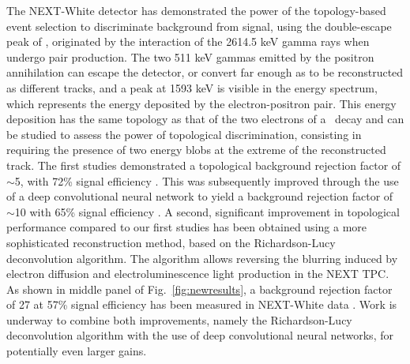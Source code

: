 The NEXT-White detector has demonstrated the power of the topology-based event selection to discriminate background from signal, using the double-escape peak of , originated by the interaction of the 2614.5 keV gamma rays when undergo pair production. The two 511 keV gammas emitted by the positron annihilation can escape the detector, or convert far enough as to be reconstructed as different tracks, and a peak at 1593 keV is visible in the energy spectrum, which represents the energy deposited by the electron-positron pair.  This energy deposition has the same topology as that of the two electrons of a \bbonu ~decay and can be studied to assess the power of topological discrimination, consisting in requiring the presence of two energy blobs at the extreme of the reconstructed track.  The first studies demonstrated a topological background rejection factor of $\sim$5, with 72\% signal efficiency \cite{Ferrario:2019kwg}. This was subsequently improved through the use of a deep convolutional neural network to yield a background rejection factor of  $\sim$10 with 65\% signal efficiency \cite{NEXT:2020jmz}. A second, significant improvement in topological performance compared to our first studies has been obtained using a more sophisticated reconstruction method, based on the Richardson-Lucy deconvolution algorithm. The algorithm allows reversing the blurring induced by electron diffusion and electroluminescence light production in the NEXT TPC. As shown in middle panel of Fig.~\ref{fig:newresults}, a  background rejection factor of 27 at 57\% signal efficiency has been measured in NEXT-White data \cite{NEXT:2021pjq}. Work is underway to combine both improvements, namely the Richardson-Lucy deconvolution algorithm with the use of deep convolutional neural networks, for potentially even larger gains.

\indent



